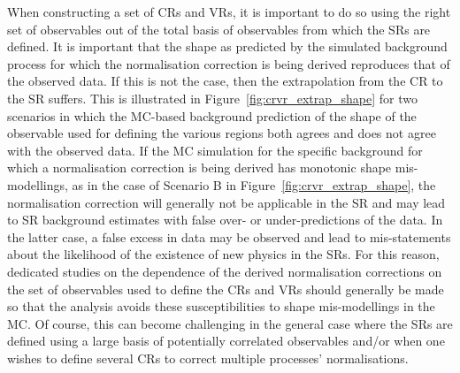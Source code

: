 When constructing a set of CRs and VRs, it is important to do so using the right set of observables
out of the total basis of observables from which the SRs are defined.
It is important that the shape as predicted by the simulated background process for which
the normalisation correction is being derived reproduces that of the observed data.
If this is not the case, then the extrapolation from the CR to the SR suffers.
This is illustrated in Figure~\ref{fig:crvr_extrap_shape} for two scenarios in which
the MC-based background prediction of the shape of the observable used for defining
the various regions both agrees and does not agree with the observed data.
If the MC simulation for the specific background for which a normalisation correction is being derived
has monotonic shape mis-modellings, as in the case of Scenario B in Figure~\ref{fig:crvr_extrap_shape},
the normalisation correction will generally not be applicable in the SR and may lead to
SR background estimates with false over- or under-predictions of the data.
In the latter case, a false excess in data may be observed and lead to mis-statements about the
likelihood of the existence of new physics in the SRs.
For this reason, dedicated studies on the dependence of the derived normalisation corrections
on the set of observables used to define the CRs and VRs should generally be made so
that the analysis avoids these susceptibilities to shape mis-modellings in the MC.
Of course, this can become challenging in the general case where the SRs are defined using a large basis of potentially
correlated observables
and/or when one wishes to define several CRs to correct multiple processes' normalisations.

